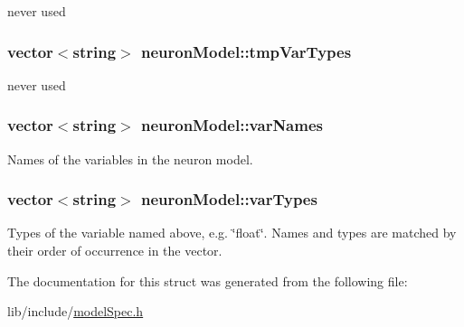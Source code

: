 never used 

\hypertarget{structneuronModel_a3f5668e85624014cd5de97bf00d2b82f}{
\subsubsection[{tmp\+Var\+Types}]{\setlength{\rightskip}{0pt plus 5cm}vector$<$string$>$ neuron\+Model\+::tmp\+Var\+Types}}\label{structneuronModel_a3f5668e85624014cd5de97bf00d2b82f}


never used 

\hypertarget{structneuronModel_a9a9156ffb643572fd67f6e585ef79ad0}{
\subsubsection[{var\+Names}]{\setlength{\rightskip}{0pt plus 5cm}vector$<$string$>$ neuron\+Model\+::var\+Names}}\label{structneuronModel_a9a9156ffb643572fd67f6e585ef79ad0}


Names of the variables in the neuron model. 

\hypertarget{structneuronModel_a86788cb29131da0a26ce79693a076352}{
\subsubsection[{var\+Types}]{\setlength{\rightskip}{0pt plus 5cm}vector$<$string$>$ neuron\+Model\+::var\+Types}}\label{structneuronModel_a86788cb29131da0a26ce79693a076352}


Types of the variable named above, e.\+g. \char`\"{}float\char`\"{}. Names and types are matched by their order of occurrence in the vector. 



The documentation for this struct was generated from the following file\+:\begin{DoxyCompactItemize}
\item 
lib/include/\hyperlink{modelSpec_8h}{model\+Spec.\+h}\end{DoxyCompactItemize}
